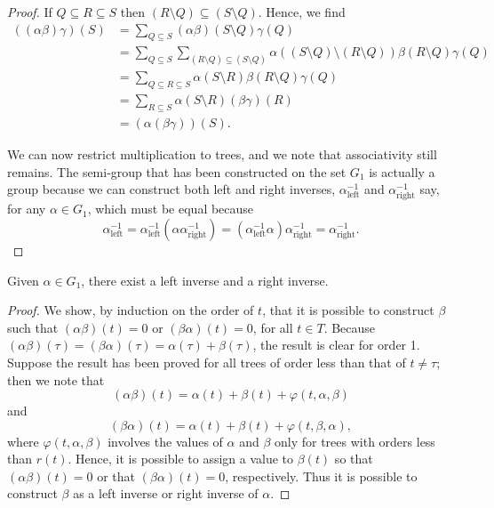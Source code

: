 \begin{theorem}
\begin{proof}
If $Q \subseteq R \subseteq S$ then $(R \setminus Q) \subseteq (S \setminus Q)$. Hence, we find
\begin{align*}
((\alpha\beta)\gamma)(S) &= \sum_{Q \subseteq S} (\alpha\beta)(S \setminus Q)\gamma(Q) \\
&= \sum_{Q \subseteq S} \sum_{(R \setminus Q) \subseteq (S \setminus Q)} \alpha((S \setminus Q) \setminus (R \setminus Q))\beta(R \setminus Q)\gamma(Q) \\
&= \sum_{Q \subseteq R \subseteq S} \alpha(S \setminus R)\beta(R \setminus Q)\gamma(Q) \\
&= \sum_{R \subseteq S} \alpha(S \setminus R)(\beta\gamma)(R) \\
&= (\alpha(\beta\gamma))(S).
\end{align*}

We can now restrict multiplication to trees, and we note that associativity still remains. The semi-group that has been constructed on the set $G_{1}$ is actually a group because we can construct both left and right inverses, $\alpha_{\text{left}}^{-1}$ and $\alpha_{\text{right}}^{-1}$ say, for any $\alpha \in G_{1}$, which must be equal because
\[
\alpha_{\text{left}}^{-1} = \alpha_{\text{left}}^{-1} (\alpha \alpha_{\text{right}}^{-1}) = (\alpha_{\text{left}}^{-1} \alpha) \alpha_{\text{right}}^{-1} = \alpha_{\text{right}}^{-1}.
\]
\end{proof}

\begin{lemma}

  \label{lem:383C}
  \uses{}
Given $\alpha \in G_1$, there exist a left inverse and a right inverse.
\end{lemma}

\begin{proof}

We show, by induction on the order of $t$, that it is possible to
construct $\beta$ such that $(\alpha\beta)(t) = 0$ or $(\beta\alpha)(t) = 0$, for all $t \in T$. Because
$(\alpha\beta)(\tau) = (\beta\alpha)(\tau) = \alpha(\tau) + \beta(\tau)$, the result is clear for order 1. Suppose the
result has been proved for all trees of order less than that of $t \neq \tau$; then we
note that
\[
(\alpha\beta)(t) = \alpha(t) + \beta(t) + \varphi(t, \alpha, \beta)
\]
and
\[
(\beta\alpha)(t) = \alpha(t) + \beta(t) + \varphi(t, \beta, \alpha),
\]
where $\varphi(t, \alpha, \beta)$ involves the values of $\alpha$ and $\beta$ only for trees with orders less
than $r(t)$. Hence, it is possible to assign a value to $\beta(t)$ so that $(\alpha\beta)(t) = 0$
or that $(\beta\alpha)(t) = 0$, respectively. Thus it is possible to construct $\beta$ as a left
inverse or right inverse of $\alpha$.


\end{proof}
\end{theorem}
